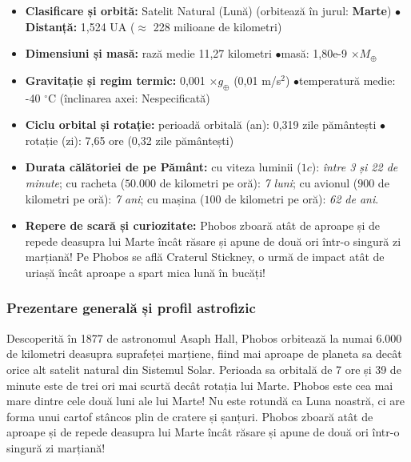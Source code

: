 \begin{tcolorbox}[orbitardata, title={\textbf{Repere esențiale: Phobos}}]
\small
\begin{itemize}[leftmargin=1.4em, itemsep=2pt, topsep=2pt]
  \item \textbf{Clasificare și orbită:} Satelit Natural (Lună) (orbitează în jurul: \textbf{Marte}) \quad$\bullet$\quad \textbf{Distanță:} 1,524 UA ($\approx$ 228 milioane de kilometri)
  \item \textbf{Dimensiuni și masă:} rază medie 11,27 kilometri \quad$\bullet$\quad masă: 1,80e-9 $\times M_\oplus$
  \item \textbf{Gravitație și regim termic:} 0,001 $\times g_\oplus$ (0,01 m/s$^2$) \quad$\bullet$\quad temperatură medie: -40 $^\circ$C (înclinarea axei: Nespecificată)
  \item \textbf{Ciclu orbital și rotație:} perioadă orbitală (an): 0,319 zile pământești \quad$\bullet$\quad rotație (zi): 7,65 ore (0,32 zile pământești)
  \item \textbf{Durata călătoriei de pe Pământ:} cu viteza luminii ($1c$): \emph{între 3 și 22 de minute}; cu racheta ($50.000$ de kilometri pe oră): \emph{7 luni}; cu avionul ($900$ de kilometri pe oră): \emph{7 ani}; cu mașina ($100$ de kilometri pe oră): \emph{62 de ani}.
  \item \textbf{Repere de scară și curiozitate:} Phobos zboară atât de aproape și de repede deasupra lui Marte încât răsare și apune de două ori într-o singură zi marțiană! Pe Phobos se află Craterul Stickney, o urmă de impact atât de uriașă încât aproape a spart mica lună în bucăți!
\end{itemize}
\end{tcolorbox}

\subsubsection*{Prezentare generală și profil astrofizic}
Descoperită în 1877 de astronomul Asaph Hall, Phobos orbitează la numai 6.000 de kilometri deasupra suprafeței marțiene, fiind mai aproape de planeta sa decât orice alt satelit natural din Sistemul Solar. Perioada sa orbitală de 7 ore și 39 de minute este de trei ori mai scurtă decât rotația lui Marte. Phobos este cea mai mare dintre cele două luni ale lui Marte! Nu este rotundă ca Luna noastră, ci are forma unui cartof stâncos plin de cratere și șanțuri. Phobos zboară atât de aproape și de repede deasupra lui Marte încât răsare și apune de două ori într-o singură zi marțiană!


